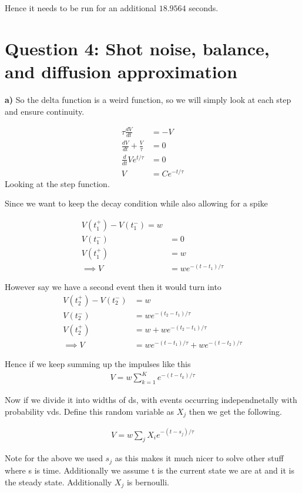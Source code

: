 \documentclass{article}
\begin{document}
Hence it needs to be run for an additional $18.9564$ seconds.

\section{Question 4: Shot noise, balance, and diffusion approximation}

\textbf{a)} So the delta function is a weird function, so we will simply look at each step
and ensure continuity.

\begin{align}
    \tau \frac{dV}{dt} &= -V\\
    \frac{dV}{dt} + \frac{V}{\tau} &= 0\\
    \frac{d}{dt}Ve^{t/\tau} &= 0\\
    V &= Ce^{-t/\tau}
\end{align}
Looking at the step function.

Since we want to keep the decay condition while also allowing for a spike

\begin{align}
    V(t_1^+) - V(t_1^-) = w\\
    V(t_1^-) &= 0\\
    V(t_1^+) &= w\\
    \implies V &= we^{-(t-t_1)/\tau}
\end{align}

However say we have a second event then it would turn into
\begin{align}
    V(t_2^+) - V(t_2^-) &= w\\
    V(t_2^-) &= we^{-(t_2-t_1)/\tau}\\
    V(t_2^+) &= w + we^{-(t_2-t_1)/\tau}\\
    \implies V &= we^{-(t-t_1)/\tau} + we^{-(t-t_2)/\tau}
\end{align}

Hence if we keep summing up the impulses like this
\begin{align}
    V = w \sum_{k=1}^K e^{-(t-t_k)/\tau}
\end{align}

Now if we divide it into widths of ds, with events occurring independnetally with probability vds.
Define this random variable as $X_j$ then we get the following.


\begin{align}
    V = w \sum_{j} X_i e^{-(t-s_j)/\tau}
\end{align}

Note for the above we used $s_j$ as this makes it much nicer to solve other stuff where s is time.
Additionally we assume t is the current state we are at and it is the steady state. Additionally
$X_j$ is bernoulli.
\end{document}
